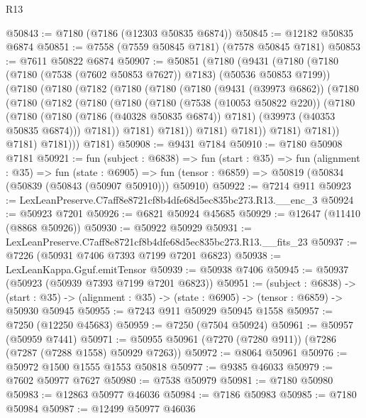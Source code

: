\begin{lexlean}{R13}
\begin{coremodule}
@50843 := @7180 (@7186 (@12303 @50835 @6874))
@50845 := @12182 @50835 @6874
@50851 := @7558 (@7559 @50845 @7181) (@7578 @50845 @7181)
@50853 := @7611 @50822 @6874
@50907 := @50851
    (@7180
      (@9431
        (@7180
          (@7180 (@7180 (@7538 (@7602 @50853 @7627)) @7183) (@50536 @50853 @7199))
          (@7180
            (@7180
              (@7182
                (@7180
                  (@7180
                    (@7180
                      (@9431 (@39973 @6862))
                      (@7180
                        (@7180
                          (@7182
                            (@7180
                              (@7180
                                (@7180
                                  (@7538 (@10053 @50822 @220))
                                  (@7180
                                    (@7180
                                      (@7180 (@7186 (@40328 @50835 @6874)) @7181)
                                      (@39973 (@40353 @50835 @6874)))
                                    @7181))
                                @7181)
                              @7181))
                          @7181)
                        @7181))
                    @7181)
                  @7181))
              @7181)
            @7181)))
      @7181)
@50908 := @9431 @7184
@50910 := @7180 @50908 @7181
@50921 := fun (subject : @6838) =>
  fun (start : @35) =>
  fun (alignment : @35) =>
  fun (state : @6905) =>
  fun (tensor : @6859) => @50819 (@50834 (@50839 (@50843 (@50907 @50910))) @50910)
@50922 := @7214 @911
@50923 := LexLeanPreserve.C7aff8e8721cf8b4dfe68d5ec835bc273.R13.__enc_3
@50924 := @50923 @7201
@50926 := @6821 @50924 @45685
@50929 := @12647 (@11410 (@8868 @50926))
@50930 := @50922 @50929
@50931 := LexLeanPreserve.C7aff8e8721cf8b4dfe68d5ec835bc273.R13.__fits_23
@50937 := @7226 (@50931 @7406 @7393 @7199 @7201 @6823)
@50938 := LexLeanKappa.Gguf.emitTensor
@50939 := @50938 @7406
@50945 := @50937 (@50923 (@50939 @7393 @7199 @7201 @6823))
@50951 := (subject : @6838) ->
  (start : @35) -> (alignment : @35) -> (state : @6905) -> (tensor : @6859) -> @50930 @50945
@50955 := @7243 @911 @50929 @50945 @1558
@50957 := @7250 (@12250 @45683)
@50959 := @7250 (@7504 @50924)
@50961 := @50957 (@50959 @7441)
@50971 := @50955 @50961 (@7270 (@7280 @911)) (@7286 (@7287 (@7288 @1558) @50929 @7263))
@50972 := @8064 @50961
@50976 := @50972 @1500 @1555 @1553 @50818
@50977 := @9385 @46033
@50979 := @7602 @50977 @7627
@50980 := @7538 @50979
@50981 := @7180 @50980
@50983 := @12863 @50977 @46036
@50984 := @7186 @50983
@50985 := @7180 @50984
@50987 := @12499 @50977 @46036

\end{coremodule}
\end{lexlean}
